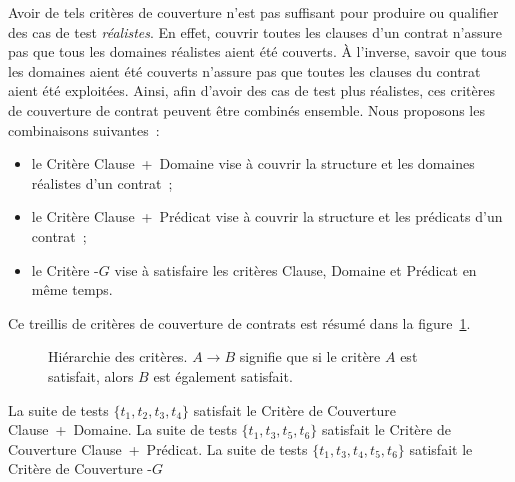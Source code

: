 Avoir de tels critères de couverture n'est pas suffisant pour produire ou
qualifier des cas de test {\em réalistes}. En effet, couvrir toutes les clauses
d'un contrat n'assure pas que tous les domaines réalistes aient été couverts. À
l'inverse, savoir que tous les domaines aient été couverts n'assure pas que
toutes les clauses du contrat aient été exploitées. Ainsi, afin d'avoir des cas
de test plus réalistes, ces critères de couverture de contrat peuvent être
combinés ensemble.  Nous proposons les combinaisons suivantes~:
%
\begin{itemize}

\item le Critère Clause~+~Domaine vise à couvrir la structure et les domaines
réalistes d'un contrat~;

\item le Critère Clause~+~Prédicat vise à couvrir la structure et les prédicats
d'un contrat~;

\item le Critère -$G$ vise à satisfaire les critères Clause,
Domaine et Prédicat en même temps.

\end{itemize}
%
Ce {\strong treillis} de critères de couverture de contrats est résumé dans la
figure~\ref{figure:test:lattice}.

\begin{figure}


\caption{\label{figure:test:lattice} Hiérarchie des critères. $A \rightarrow B$
signifie que si le critère $A$ est satisfait, alors $B$ est également
satisfait.}

\end{figure}

\begin{example}

La suite de tests $\{t_1, t_2, t_3, t_4\}$ satisfait le Critère de Couverture
Clause~+~Domaine. La suite de tests $\{t_1, t_3, t_5, t_6\}$ satisfait le
Critère de Couverture Clause~+~Prédicat. La suite de tests $\{t_1, t_3, t_4,
t_5, t_6\}$ satisfait le Critère de Couverture -$G$

\end{example}
